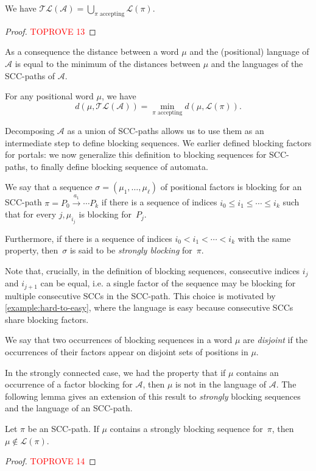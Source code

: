 \documentclass[letterpaper, USenglish, cleveref, autoref, thm-restate, numberwithinsect]{lipics-v2021}
\theoremstyle{theorem}
\theoremstyle{definition}
\newcommand{\Aa}{\mathcal{A}}
\newcommand{\lang}[1]{\mathcal{L}(#1)}
\newcommand{\SCCpath}{\pi}
\newcommand{\timedlang}[1]{\mathcal{TL}( #1 )}
\begin{document}
\begin{lemma}\label{lemma:lang-path-union}
	We have \(\timedlang{\Aa} = \bigcup_{\SCCpath \text{ accepting}} \lang{\SCCpath}.\)
\end{lemma}
\begin{proof}\textcolor{red}{TOPROVE 13}\end{proof}

As a consequence the distance between a word $\mu$ and the (positional) language of $\Aa$ is equal to the minimum of the distances between $\mu$ and the languages of the SCC-paths of $\Aa$.
\begin{corollary}\label{coro:dist-to-l-path}
	For any positional word $\mu$, we have \[d(\mu, \timedlang{\Aa}) = \min_{\SCCpath \text{ accepting}} d(\mu,\lang{\SCCpath}).\]
\end{corollary}

Decomposing $\Aa$ as a union of SCC-paths allows us to use them as an intermediate step to define blocking sequences.
We earlier defined blocking factors for portals: we now generalize this definition to blocking sequences for SCC-paths, to finally define blocking sequence of automata.

\begin{definition}
	We say that a sequence $\sigma = (\mu_1, \ldots, \mu_\ell)$ of positional factors is blocking for an SCC-path 
	$\SCCpath = P_0 \xrightarrow{a_1} \cdots  P_k$ if there is a sequence of indices $i_0 \leq i_1 \leq \cdots \leq i_k$ 
	such that for every $j, \mu_{i_j}$ is blocking for~$P_j$.

	Furthermore, if there is a sequence of indices $i_0 < i_1 < \cdots < i_k$ with the same property, then~$\sigma$ is said to be \emph{strongly blocking} for~$\SCCpath$.
\end{definition}

Note that, crucially, in the definition of blocking sequences, consecutive indices $i_j$ and $i_{j+1}$ can be equal, i.e. a single factor of the sequence may be blocking for multiple consecutive SCCs in the SCC-path. This choice is motivated by \cref{example:hard-to-easy}, where the language is easy because consecutive SCCs share blocking factors.

We say that two occurrences of blocking sequences in a word $\mu$ are \emph{disjoint} if the occurrences of their factors appear on disjoint sets of positions in $\mu$.

In the strongly connected case, we had the property that if $\mu$ contains an occurrence of a factor blocking for $\Aa$, then $\mu$ is not in the language of $\Aa$.
The following lemma gives an extension of this result to \emph{strongly} blocking sequences and the language of an SCC-path.
\begin{lemma}\label{lem:strongly-blocking-implies-not-in-path}
	Let $\SCCpath$ be an SCC-path.
    If $\mu$ contains a strongly blocking sequence for~$\SCCpath$,
    then $\mu \notin \lang{\SCCpath}$.
\end{lemma}
\begin{proof}\textcolor{red}{TOPROVE 14}\end{proof}
\end{document}
